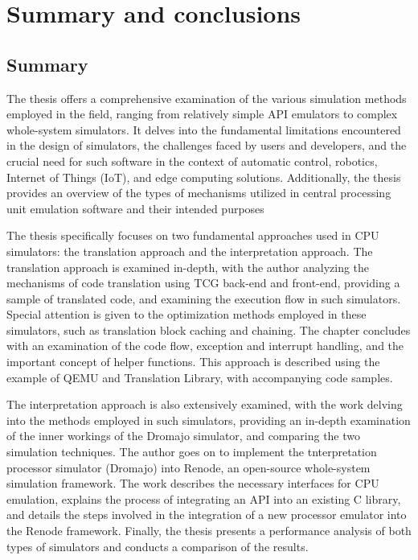 
\chapter{Summary and conclusions}

\section{Summary}

The thesis offers a comprehensive examination of the various simulation methods employed in the field, ranging from
relatively simple API emulators to complex whole-system simulators. It delves into the fundamental limitations
encountered in the design of simulators, the challenges faced by users and developers, and the crucial need for such
software in the context of automatic control, robotics, Internet of Things (IoT), and edge computing solutions.
Additionally, the thesis provides an overview of the types of mechanisms utilized in central processing unit emulation
software and their intended purposes

The thesis specifically focuses on two fundamental approaches used in CPU simulators: the translation approach and the
interpretation approach. The translation approach is examined in-depth, with the author analyzing the mechanisms of code
translation using TCG back-end and front-end, providing a sample of translated code, and examining the execution flow
in such simulators. Special attention is given to the optimization methods employed in these simulators, such as
translation block caching and chaining. The chapter concludes with an examination of the code flow, exception and
interrupt handling, and the important concept of helper functions. This approach is described using the example of QEMU
and Translation Library, with accompanying code samples.


The interpretation approach is also extensively examined, with the work delving into the methods employed in such
simulators, providing an in-depth examination of the inner workings of the Dromajo simulator, and comparing the two
simulation techniques. The author goes on to implement the tnterpretation processor simulator (Dromajo) into Renode, an
open-source whole-system simulation framework. The work describes the necessary interfaces for CPU emulation, explains
the process of integrating an API into an existing C library, and details the steps involved in the integration of a new
processor emulator into the Renode framework. Finally, the thesis presents a performance analysis of both types of
simulators and conducts a comparison of the results.

